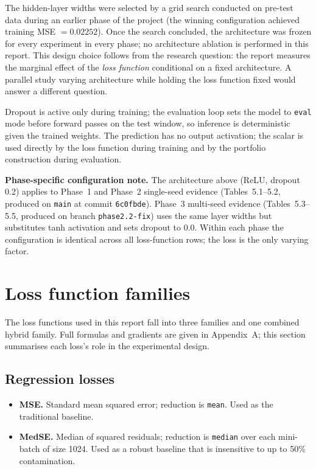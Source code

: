 The hidden-layer widths were selected by a grid search conducted on pre-test data during an earlier phase of the project (the winning configuration achieved training MSE $= 0.02252$). Once the search concluded, the architecture was frozen for every experiment in every phase; no architecture ablation is performed in this report. This design choice follows from the research question: the report measures the marginal effect of the \emph{loss function} conditional on a fixed architecture. A parallel study varying architecture while holding the loss function fixed would answer a different question.

Dropout is active only during training; the evaluation loop sets the model to \texttt{eval} mode before forward passes on the test window, so inference is deterministic given the trained weights. The prediction has no output activation; the scalar is used directly by the loss function during training and by the portfolio construction during evaluation.

\textbf{Phase-specific configuration note.} The architecture above (ReLU, dropout 0.2) applies to Phase~1 and Phase~2 single-seed evidence (Tables~5.1--5.2, produced on \texttt{main} at commit \texttt{6c0fbde}). Phase~3 multi-seed evidence (Tables~5.3--5.5, produced on branch \texttt{phase2.2-fix}) uses the same layer widths but substitutes tanh activation and sets dropout to 0.0. Within each phase the configuration is identical across all loss-function rows; the loss is the only varying factor.

\section{Loss function families}

\label{sec:loss-function-families}

The loss functions used in this report fall into three families and one combined hybrid family. Full formulas and gradients are given in Appendix~A; this section summarises each loss's role in the experimental design.

\subsection{Regression losses}

\label{subsec:regression-losses}

\begin{itemize}
 \item \textbf{MSE.} Standard mean squared error; reduction is \texttt{mean}. Used as the traditional baseline.
 \item \textbf{MedSE.} Median of squared residuals; reduction is \texttt{median} over each mini-batch of size 1024. Used as a robust baseline that is insensitive to up to 50\% contamination.
\end{itemize}

